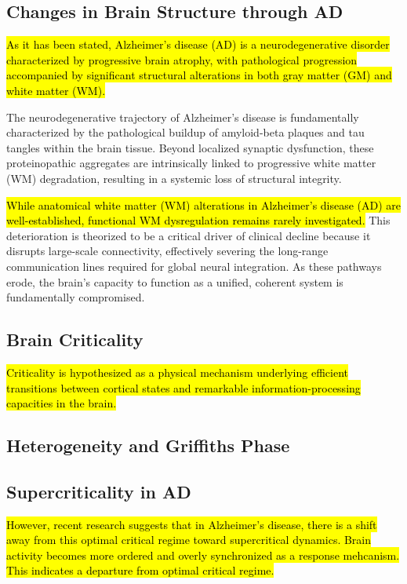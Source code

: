 \documentclass[12pt,a4paper]{article}
\begin{document}
\subsection{Changes in Brain Structure through AD}

\hl{As it has been stated, Alzheimer's disease (AD) is a neurodegenerative disorder characterized by progressive brain atrophy, with pathological progression accompanied by significant structural alterations in both gray matter (GM) and white matter (WM).}

The neurodegenerative trajectory of Alzheimer's disease is fundamentally characterized by the pathological buildup of amyloid-beta plaques and tau tangles within the brain tissue. Beyond localized synaptic dysfunction, these proteinopathic aggregates are intrinsically linked to progressive white matter (WM) degradation, resulting in a systemic loss of structural integrity.

\hl{While anatomical white matter (WM) alterations in Alzheimer's disease (AD) are well-established, functional WM dysregulation remains rarely investigated.} This deterioration is theorized to be a critical driver of clinical decline because it disrupts large-scale connectivity, effectively severing the long-range communication lines required for global neural integration. As these pathways erode, the brain's capacity to function as a unified, coherent system is fundamentally compromised.

\subsection{Brain Criticality}

\hl{Criticality is hypothesized as a physical mechanism underlying efficient transitions between cortical states and remarkable information-processing capacities in the brain.}

\subsection{Heterogeneity and Griffiths Phase}


\subsection{Supercriticality in AD}

\hl{However, recent research suggests that in Alzheimer's disease, there is a shift away from this optimal critical regime toward supercritical dynamics. Brain activity becomes more ordered and overly synchronized as a response mehcanism. This indicates a departure from optimal critical regime.}
\end{document}
